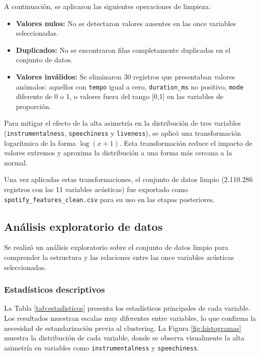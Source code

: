 A continuación, se aplicaron las siguientes operaciones de limpieza:

\begin{itemize}
    \item \textbf{Valores nulos:} No se detectaron valores ausentes en las once variables seleccionadas.
    \item \textbf{Duplicados:} No se encontraron filas completamente duplicadas en el conjunto de datos.
    \item \textbf{Valores inválidos:} Se eliminaron 30 registros que presentaban valores anómalos: aquellos con \texttt{tempo} igual a cero, \texttt{duration\_ms} no positivo, \texttt{mode} diferente de 0 o 1, o valores fuera del rango [0,1] en las variables de proporción.
\end{itemize}

Para mitigar el efecto de la alta asimetría en la distribución de tres variables (\texttt{instrumentalness}, \texttt{speechiness} y \texttt{liveness}), se aplicó una transformación logarítmica de la forma $\log(x+1)$. Esta transformación reduce el impacto de valores extremos y aproxima la distribución a una forma más cercana a la normal.

Una vez aplicadas estas transformaciones, el conjunto de datos limpio (2.110.286 registros con las 11 variables acústicas) fue exportado como \texttt{spotify\_features\_clean.csv} para su uso en las etapas posteriores.

\subsection{Análisis exploratorio de datos}

Se realizó un análisis exploratorio sobre el conjunto de datos limpio para comprender la estructura y las relaciones entre las once variables acústicas seleccionadas.

\subsubsection{Estadísticos descriptivos}

La Tabla \ref{tab:estadisticos} presenta los estadísticos principales de cada variable. Los resultados muestran escalas muy diferentes entre variables, lo que confirma la necesidad de estandarización previa al clustering. La Figura \ref{fig:histogramas} muestra la distribución de cada variable, donde se observa visualmente la alta asimetría en variables como \texttt{instrumentalness} y \texttt{speechiness}.

